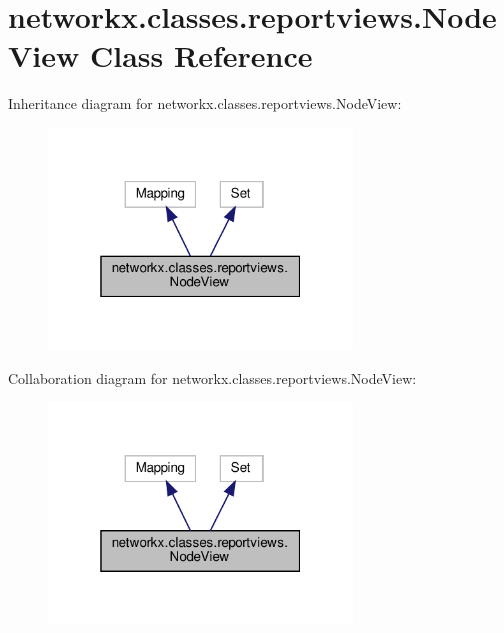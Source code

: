 \hypertarget{classnetworkx_1_1classes_1_1reportviews_1_1NodeView}{}\section{networkx.\+classes.\+reportviews.\+Node\+View Class Reference}
\label{classnetworkx_1_1classes_1_1reportviews_1_1NodeView}


Inheritance diagram for networkx.\+classes.\+reportviews.\+Node\+View\+:
\nopagebreak
\begin{figure}[H]
\begin{center}
\leavevmode
\includegraphics[width=229pt]{classnetworkx_1_1classes_1_1reportviews_1_1NodeView__inherit__graph}
\end{center}
\end{figure}


Collaboration diagram for networkx.\+classes.\+reportviews.\+Node\+View\+:
\nopagebreak
\begin{figure}[H]
\begin{center}
\leavevmode
\includegraphics[width=229pt]{classnetworkx_1_1classes_1_1reportviews_1_1NodeView__coll__graph}
\end{center}
\end{figure}

